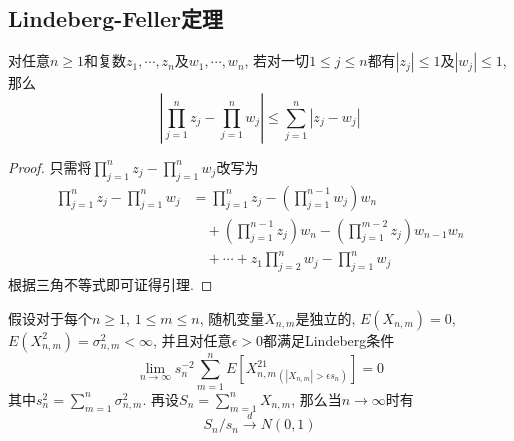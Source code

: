 \documentclass[cn, 12pt, math=mtpro2, bibstyle=apa, blue, twocol]{elegantbook}
\newcommand{\limn}{\lim_{n\to\infty}}
\begin{document}
\subsection{Lindeberg-Feller定理}
 \begin{lemma}\label{lem:lem3.6}
  对任意$n\ge1$和复数$z_1,\cdots,z_n$及$w_1,\cdots,w_n$, 若对一切$1\leq j\leq n$都有$|z_j|\leq1$及$|w_j|\leq1$, 那么
  $$\left|\prod_{j=1}^{n}z_j-\prod_{j=1}^{n}w_j\right|\leq\sum_{j=1}^{n}|z_j-w_j|$$
  \end{lemma}
  \begin{proof}
    只需将$\prod_{j=1}^{n}z_j-\prod_{j=1}^{n}w_j$改写为
    \begin{align*}
    \prod_{j=1}^{n}z_j-\prod_{j=1}^{n}w_j&=\prod_{j=1}^{n}z_j-\left(\prod_{j=1}^{n-1}w_j\right)w_n \\
    &\quad +\left(\prod_{j=1}^{n-1}z_j\right)w_n-\left(\prod_{j=1}^{m-2}z_j\right)w_{n-1}w_n \\
    &\quad +\cdots+z_1\prod_{j=2}^{n}w_j-\prod_{j=1}^{n}w_j
    \end{align*}
    根据三角不等式即可证得引理.
\end{proof}
\begin{theorem}
  假设对于每个$n\ge1$, $1\leq m\leq n$, 随机变量$X_{n,m}$是独立的, $E(X_{n,m})=0$, $E(X_{n,m}^2)=\sigma_{n,m}^2<\infty$, 并且对任意$\epsilon>0$都满足Lindeberg条件
  \begin{equation}\label{eq3.23}
    \limn s_n^{-2}\sum_{m=1}^{n}E[X_{n,m}^21_{(|X_{n,m}|>\epsilon s_n)}]=0
  \end{equation}
  其中$s_n^2=\sum_{m=1}^{n}\sigma_{n,m}^2$. 再设$S_n=\sum_{m=1}^{n}X_{n,m}$, 那么当$n\to\infty$时有
  $$S_n/s_n\xrightarrow{d} N(0,1)$$
\end{theorem}
\end{document}
